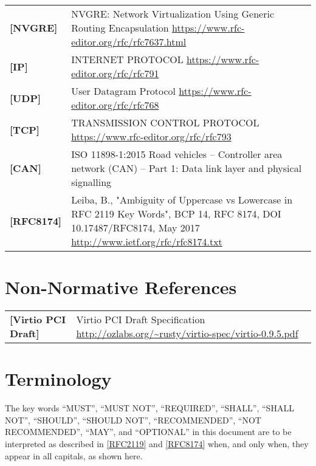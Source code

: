 \begin{longtable}{l p{5in}}
	\label{intro:nvgre}\textbf{[NVGRE]} &
    NVGRE: Network Virtualization Using Generic Routing Encapsulation
	\newline\url{https://www.rfc-editor.org/rfc/rfc7637.html}\\
	\label{intro:IP}\textbf{[IP]} &
    INTERNET PROTOCOL
	\newline\url{https://www.rfc-editor.org/rfc/rfc791}\\
	\label{intro:UDP}\textbf{[UDP]} &
    User Datagram Protocol
	\newline\url{https://www.rfc-editor.org/rfc/rfc768}\\
	\label{intro:TCP}\textbf{[TCP]} &
    TRANSMISSION CONTROL PROTOCOL
	\newline\url{https://www.rfc-editor.org/rfc/rfc793}\\
	\label{intro:CAN}\textbf{[CAN]} &
    ISO 11898-1:2015 Road vehicles -- Controller area network (CAN) -- Part 1: Data link layer and physical signalling\\
	\label{intro:rfc8174}\textbf{[RFC8174]} &
    Leiba, B., "Ambiguity of Uppercase vs Lowercase in RFC 2119 Key Words", BCP
    14, RFC 8174, DOI 10.17487/RFC8174, May 2017
        \newline\url{http://www.ietf.org/rfc/rfc8174.txt}\\
\end{longtable}

\section{Non-Normative References}

\begin{longtable}{l p{5in}}
	\label{intro:Virtio PCI Draft}\textbf{[Virtio PCI Draft]} &
	Virtio PCI Draft Specification
	\newline\url{http://ozlabs.org/~rusty/virtio-spec/virtio-0.9.5.pdf}\\
\end{longtable}

\section{Terminology}\label{Terminology}

The key words ``MUST'', ``MUST NOT'', ``REQUIRED'', ``SHALL'', ``SHALL NOT'',
``SHOULD'', ``SHOULD NOT'', ``RECOMMENDED'', ``NOT RECOMMENDED'', ``MAY'', and
``OPTIONAL'' in this document are to be interpreted as described in
\hyperref[intro:rfc2119]{[RFC2119]} and \hyperref[intro:rfc8174]{[RFC8174]} when,
and only when, they appear in all capitals, as shown here.
